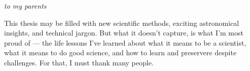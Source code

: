 \documentclass[12pt]{myucthesis}
\begin{document}
\hypersetup{pageanchor=true}
\begin{frontmatter}

\begin{dedication}
\null\vfil
{\large
\begin{center}
\textit{to my parents}
\end{center}}
\null\vfil
\end{dedication}

\tableofcontents
\listoffigures %
\listoftables %


\begin{acknowledgements}
This thesis may be filled with new scientific methods, exciting astronomical insights, and technical jargon. But what it doesn't capture, is what I'm most proud of --- the life lessons I've learned about what it means to be a scientist, what it means to do good science, and how to learn and preservere despite challenges. For that, I must thank many people.


\end{acknowledgements}
\end{frontmatter}







{}
\end{document}
